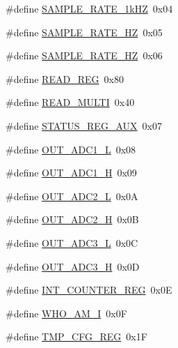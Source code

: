 \begin{DoxyCompactItemize}
\item 
\#define \hyperlink{group___definitions___a_d_s1299_gaf2dfbc6a6285e107326cbccc5479315c}{S\+A\+M\+P\+L\+E\+\_\+\+R\+A\+T\+E\+\_\+1k\+H\+Z}~0x04
\item 
\#define \hyperlink{group___definitions___a_d_s1299_gaf163a1e96df56cabcad0788fa1ea6623}{S\+A\+M\+P\+L\+E\+\_\+\+R\+A\+T\+E\+\_\+H\+Z}~0x05
\item 
\#define \hyperlink{group___definitions___a_d_s1299_gaae7b97aa13fe1e6a465ceab2491b6ca0}{S\+A\+M\+P\+L\+E\+\_\+\+R\+A\+T\+E\+\_\+H\+Z}~0x06
\item 
\#define \hyperlink{group___definitions___a_d_s1299_ga0de38d1ad757dd761c5714b09125d717}{R\+E\+A\+D\+\_\+\+R\+E\+G}~0x80
\item 
\#define \hyperlink{group___definitions___a_d_s1299_gaf1b9917151f8b211b70f29ef381a2056}{R\+E\+A\+D\+\_\+\+M\+U\+L\+T\+I}~0x40
\item 
\#define \hyperlink{group___definitions___a_d_s1299_ga6c61d1e86c806ad8ec147553bc2ae65e}{S\+T\+A\+T\+U\+S\+\_\+\+R\+E\+G\+\_\+\+A\+U\+X}~0x07
\item 
\#define \hyperlink{group___definitions___a_d_s1299_ga02a13233b151ce212bd73b8c60ef2765}{O\+U\+T\+\_\+\+A\+D\+C1\+\_\+\+L}~0x08
\item 
\#define \hyperlink{group___definitions___a_d_s1299_ga9d611d8189cd81ad39ac02e8ad952a1c}{O\+U\+T\+\_\+\+A\+D\+C1\+\_\+\+H}~0x09
\item 
\#define \hyperlink{group___definitions___a_d_s1299_gabe051e95084cda107d854850e13681dc}{O\+U\+T\+\_\+\+A\+D\+C2\+\_\+\+L}~0x0\+A
\item 
\#define \hyperlink{group___definitions___a_d_s1299_ga8911e0516135af3cf6e29ceec9efb3ac}{O\+U\+T\+\_\+\+A\+D\+C2\+\_\+\+H}~0x0\+B
\item 
\#define \hyperlink{group___definitions___a_d_s1299_ga2b23fdc4526c72c0d5bd545031bf8e84}{O\+U\+T\+\_\+\+A\+D\+C3\+\_\+\+L}~0x0\+C
\item 
\#define \hyperlink{group___definitions___a_d_s1299_ga6bbb6c15ca4b6630fe3bb193aac34ea4}{O\+U\+T\+\_\+\+A\+D\+C3\+\_\+\+H}~0x0\+D
\item 
\#define \hyperlink{group___definitions___a_d_s1299_gaeca9cd5b6ae9a96d544a091c88bcd7dd}{I\+N\+T\+\_\+\+C\+O\+U\+N\+T\+E\+R\+\_\+\+R\+E\+G}~0x0\+E
\item 
\#define \hyperlink{group___definitions___a_d_s1299_ga9fcb9e460d175bfc7ab4d80bf788b43a}{W\+H\+O\+\_\+\+A\+M\+\_\+\+I}~0x0\+F
\item 
\#define \hyperlink{group___definitions___a_d_s1299_ga4a86daacd56e474a56e206416ae4b7fb}{T\+M\+P\+\_\+\+C\+F\+G\+\_\+\+R\+E\+G}~0x1\+F

\end{DoxyCompactItemize}
